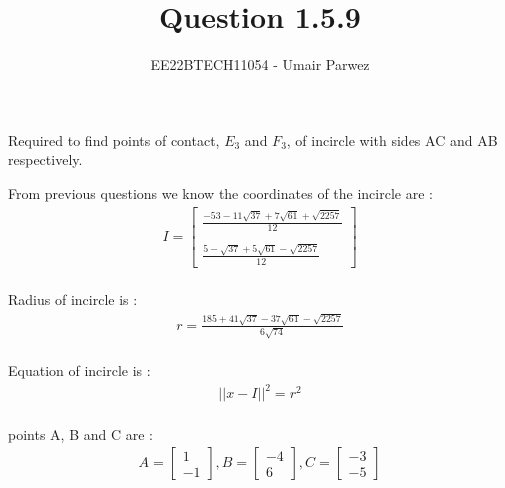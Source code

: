 \documentclass[journal,12pt,twocolumn]{IEEEtran}
\theoremstyle{remark}
\begin{document}



\vspace{3cm}

\title{
	Question 1.5.9
}

\author{
	EE22BTECH11054 - Umair Parwez
}	

\maketitle
\newpage
\bigskip

\renewcommand{\thefigure}{\theenumi}
\renewcommand{\thetable}{\theenumi}

\begin{flushleft}
	Required to find points of contact, $E_{3}$ and $F_{3}$, of incircle with sides AC and AB respectively.\\

	\bigskip

	From previous questions we know the coordinates of the incircle are : 
	\begin{align}
		I = 
		\begin {bmatrix}
			\frac{-53-11\sqrt{37}+7\sqrt{61}+\sqrt{2257}}{12} \\ \\
			\frac{5-\sqrt{37}+5\sqrt{61}-\sqrt{2257}}{12}
		\end{bmatrix}
	\end{align}\\

	Radius of incircle is :
    \begin{align}
		r = \frac{185+41\sqrt{37}-37\sqrt{61}-\sqrt{2257}}{6\sqrt{74}}
    \end{align}\\

	Equation of incircle is : 
	\begin{align}
		{\lvert \lvert x-I \rvert \rvert}^2 = {r}^2 
	\end{align}\\

	points A, B and C are : 
	\begin{align}
		A = \begin{bmatrix}
			1\\
			-1
		\end{bmatrix}, 
		B = \begin{bmatrix}
			-4\\
			6
		\end{bmatrix}, 
		C = \begin{bmatrix}
			-3\\
			-5
		\end{bmatrix}
	\end{align}\\


\end{flushleft}
\end{document}
